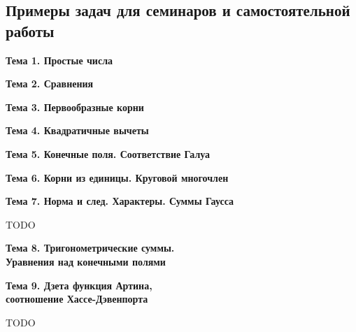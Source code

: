 \documentclass[a4paper, 12pt]{article}
\begin{document}
\subsection{Примеры задач для семинаров и самостоятельной работы \label{problems}}

\begin{center} {\bf Тема 1. Простые числа} \end{center}



\begin{center} {\bf Тема 2. Сравнения} \end{center}



\begin{center} {\bf Тема 3. Первообразные корни} \end{center}



\begin{center} {\bf Тема 4. Квадратичные вычеты} \end{center}



\begin{center} {\bf Тема 5. Конечные поля. Соответствие Галуа} \end{center}



\begin{center} {\bf Тема 6. Корни из единицы. Круговой многочлен} \end{center}



\begin{center} {\bf Тема 7. Норма и след. Характеры. Суммы Гаусса} \end{center} TODO

\begin{center} {\bf Тема 8. Тригонометрические суммы.\\ Уравнения над конечными полями} \end{center}



\begin{center} {\bf Тема 9. Дзета функция Артина,\\ соотношение Хассе-Дэвенпорта} \end{center} TODO
\end{document}

